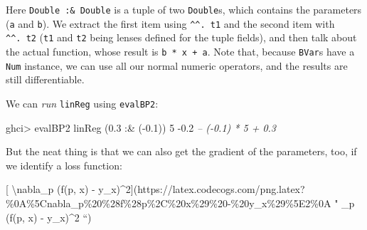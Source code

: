 \documentclass[]{article}
\newenvironment{Shaded}{}{}
\newcommand{\CommentTok}[1]{\textcolor[rgb]{0.38,0.63,0.69}{\textit{#1}}}
\newcommand{\DataTypeTok}[1]{\textcolor[rgb]{0.56,0.13,0.00}{#1}}
\newcommand{\DecValTok}[1]{\textcolor[rgb]{0.25,0.63,0.44}{#1}}
\newcommand{\FloatTok}[1]{\textcolor[rgb]{0.25,0.63,0.44}{#1}}
\newcommand{\FunctionTok}[1]{\textcolor[rgb]{0.02,0.16,0.49}{#1}}
\newcommand{\NormalTok}[1]{#1}
\newcommand{\OtherTok}[1]{\textcolor[rgb]{0.00,0.44,0.13}{#1}}
\begin{document}
Here \texttt{Double\ :\&\ Double} is a tuple of two \texttt{Double}s, which
contains the parameters (\texttt{a} and \texttt{b}). We extract the first item
using \texttt{\^{}\^{}.\ t1} and the second item with \texttt{\^{}\^{}.\ t2}
(\texttt{t1} and \texttt{t2} being lenses defined for the tuple fields), and
then talk about the actual function, whose result is \texttt{b\ *\ x\ +\ a}.
Note that, because \texttt{BVar}s have a \texttt{Num} instance, we can use all
our normal numeric operators, and the results are still differentiable.

We can \emph{run} \texttt{linReg} using \texttt{evalBP2}:

\begin{Shaded}
\begin{Highlighting}[]
\NormalTok{ghci}\FunctionTok{>}\NormalTok{ evalBP2 linReg (}\FloatTok{0.3} \FunctionTok{:&}\NormalTok{ (}\FunctionTok{-}\FloatTok{0.1}\NormalTok{)) }\DecValTok{5}
\FunctionTok{-}\FloatTok{0.2}        \CommentTok{-- (-0.1) * 5 + 0.3}
\end{Highlighting}
\end{Shaded}

But the neat thing is that we can also get the gradient of the parameters, too,
if we identify a loss function:

{[} \textbackslash{}nabla\_p (f(p, x) -
y\_x)\^{}2{]}(https://latex.codecogs.com/png.latex?\%0A\%5Cnabla\_p\%20\%28f\%28p\%2C\%20x\%29\%20-\%20y\_x\%29\%5E2\%0A
" \nabla\_p (f(p, x) - y\_x)\^{}2 ``)

\begin{Shaded}
\end{Shaded}
\end{document}

